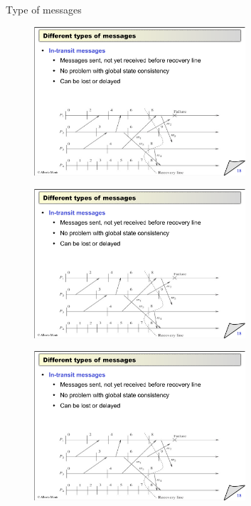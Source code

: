 \begin{frame}{Type of messages}
\begin{overprint}
\begin{figure}
	\includegraphics[width=0.7\textwidth,page=1]{figs/16/messages}
\end{figure}
\begin{figure}
	\includegraphics[width=0.7\textwidth,page=2]{figs/16/messages}
\end{figure}
\begin{figure}
	\includegraphics[width=0.7\textwidth,page=3]{figs/16/messages}
\end{figure}
\begin{figure}

\end{figure}
\end{overprint}
\end{frame}
